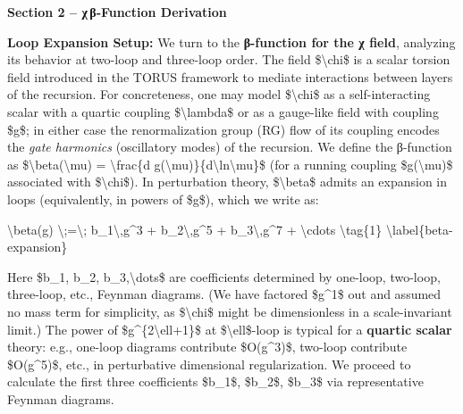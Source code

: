 \documentclass[]{article}
\begin{document}
\textbf{Section 2 -- χ\,β‑Function Derivation}

\textbf{Loop Expansion Setup:} We turn to the \textbf{β-function for the
χ field}, analyzing its behavior at two-loop and three-loop order. The
field \$\textbackslash{}chi\$ is a scalar torsion field introduced in
the TORUS framework to mediate interactions between layers of the
recursion. For concreteness, one may model \$\textbackslash{}chi\$ as a
self-interacting scalar with a quartic coupling
\$\textbackslash{}lambda\$ or as a gauge-like field with coupling \$g\$;
in either case the renormalization group (RG) flow of its coupling
encodes the \emph{gate harmonics} (oscillatory modes) of the recursion.
We define the β-function as \$\textbackslash{}beta(\textbackslash{}mu) =
\textbackslash{}frac\{d
g(\textbackslash{}mu)\}\{d\textbackslash{}ln\textbackslash{}mu\}\$ (for
a running coupling \$g(\textbackslash{}mu)\$ associated with
\$\textbackslash{}chi\$)​. In perturbation theory,
\$\textbackslash{}beta\$ admits an expansion in loops (equivalently, in
powers of \$g\$), which we write as:

\textbackslash{}beta(g) \textbackslash{};=\textbackslash{};
b\_1\textbackslash{},g\^{}3 + b\_2\textbackslash{},g\^{}5 +
b\_3\textbackslash{},g\^{}7 + \textbackslash{}cdots
\textbackslash{}tag\{1\} \textbackslash{}label\{beta-expansion\}

Here \$b\_1, b\_2, b\_3,\textbackslash{}dots\$ are coefficients
determined by one-loop, two-loop, three-loop, etc., Feynman diagrams​.
(We have factored \$g\^{}1\$ out and assumed no mass term for
simplicity, as \$\textbackslash{}chi\$ might be dimensionless in a
scale-invariant limit.) The power of \$g\^{}\{2\textbackslash{}ell+1\}\$
at \$\textbackslash{}ell\$-loop is typical for a \textbf{quartic scalar}
theory: e.g., one-loop diagrams contribute \$O(g\^{}3)\$, two-loop
contribute \$O(g\^{}5)\$, etc., in perturbative dimensional
regularization​. We proceed to calculate the first three coefficients
\$b\_1\$, \$b\_2\$, \$b\_3\$ via representative Feynman diagrams.
\end{document}
